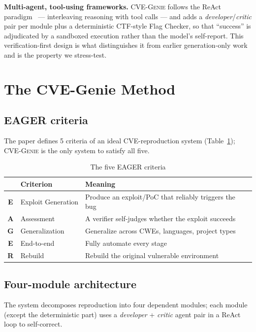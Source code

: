 \documentclass[conference,10pt,a4paper]{IEEEtran}
\begin{document}
\textbf{Multi-agent, tool-using frameworks.} CVE-G\textsc{enie} follows the ReAct paradigm~\cite{react} --- interleaving reasoning with tool calls --- and adds a \textit{developer}/\textit{critic} pair per module plus a deterministic CTF-style Flag Checker, so that ``success'' is adjudicated by a sandboxed execution rather than the model's self-report. This verification-first design is what distinguishes it from earlier generation-only work and is the property we stress-test.

\section{The CVE-G\lowercase{enie} Method}

\subsection{EAGER criteria}
The paper defines 5 criteria of an ideal CVE-reproduction system (Table~\ref{tab:eager}); CVE-G\textsc{enie} is the only system to satisfy all five.

\begin{table}[t]
\caption{The five EAGER criteria}
\label{tab:eager}
\centering\footnotesize
\begin{tabular}{@{}cl p{4.9cm}@{}}
\toprule
& Criterion & Meaning \\ \midrule
\textbf{E} & Exploit Generation & Produce an exploit/PoC that reliably triggers the bug \\
\textbf{A} & Assessment & A verifier self-judges whether the exploit succeeds \\
\textbf{G} & Generalization & Generalize across CWEs, languages, project types \\
\textbf{E} & End-to-end & Fully automate every stage \\
\textbf{R} & Rebuild & Rebuild the original vulnerable environment \\ \bottomrule
\end{tabular}
\end{table}

\subsection{Four-module architecture}
The system decomposes reproduction into four dependent modules; each module (except the deterministic part) uses a \textit{developer} + \textit{critic} agent pair in a ReAct loop to self-correct.
\end{document}

